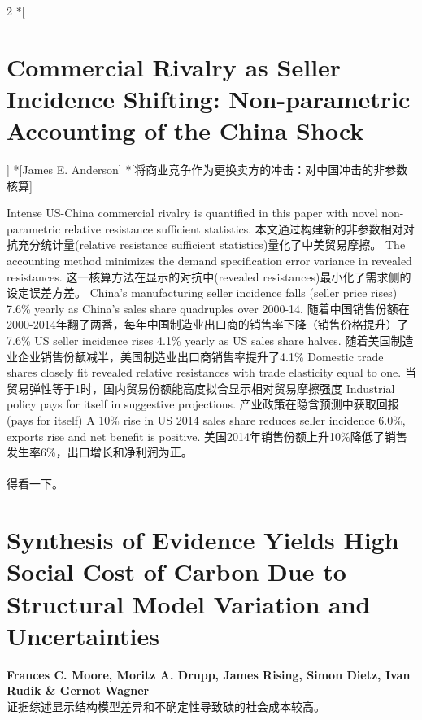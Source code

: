 \documentclass[cn,hazy,blue,14pt,screen]{elegantnote}
\begin{document}
\begin{paracol}{2}
	\switchcolumn[0]*[\section{Commercial Rivalry as Seller Incidence Shifting: Non-parametric Accounting of the China Shock}]
	\switchcolumn[0]*[James E. Anderson]
	\switchcolumn[0]*[将商业竞争作为更换卖方的冲击：对中国冲击的非参数核算]
	
	Intense US-China commercial rivalry is quantified in this paper with novel non-parametric relative resistance sufficient statistics. 
	\switchcolumn
	本文通过构建新的非参数相对对抗充分统计量(relative resistance sufficient statistics)量化了中美贸易摩擦。
	\switchcolumn*
	The accounting method minimizes the demand specification error variance in revealed resistances.
	\switchcolumn
	这一核算方法在显示的对抗中(revealed resistances)最小化了需求侧的设定误差方差。
	\switchcolumn*
	China's manufacturing seller incidence falls (seller price rises) 7.6\% yearly as China's sales share quadruples over 2000-14. 
	\switchcolumn
	随着中国销售份额在2000-2014年翻了两番，每年中国制造业出口商的销售率下降（销售价格提升）了7.6\%
	\switchcolumn*
	US seller incidence rises 4.1\% yearly as US sales share halves. 
	\switchcolumn
	随着美国制造业企业销售份额减半，美国制造业出口商销售率提升了4.1\%
	\switchcolumn*
	Domestic trade shares closely fit revealed relative resistances with trade elasticity equal to one. 
	\switchcolumn
	当贸易弹性等于1时，国内贸易份额能高度拟合显示相对贸易摩擦强度
	\switchcolumn*
	Industrial policy pays for itself in suggestive projections. 
	\switchcolumn
	产业政策在隐含预测中获取回报(pays for itself)
	\switchcolumn*
	A 10\% rise in US 2014 sales share reduces seller incidence 6.0\%, exports rise and net benefit is positive.
	\switchcolumn
	美国2014年销售份额上升10\%降低了销售发生率6\%，出口增长和净利润为正。
	\\~\\
	得看一下。
	
\end{paracol}

\section{Synthesis of Evidence Yields High Social Cost of Carbon Due to Structural Model Variation and Uncertainties}
\begin{center}
	\textbf{Frances C. Moore, Moritz A. Drupp, James Rising, Simon Dietz, Ivan Rudik \& Gernot Wagner}\\
	证据综述显示结构模型差异和不确定性导致碳的社会成本较高。
\end{center}
\end{document}
